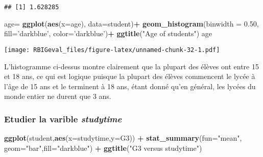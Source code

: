 \documentclass[
]{article}
\newenvironment{Shaded}{\begin{snugshade}}{\end{snugshade}}
\newcommand{\DataTypeTok}[1]{\textcolor[rgb]{0.13,0.29,0.53}{#1}}
\newcommand{\FloatTok}[1]{\textcolor[rgb]{0.00,0.00,0.81}{#1}}
\newcommand{\KeywordTok}[1]{\textcolor[rgb]{0.13,0.29,0.53}{\textbf{#1}}}
\newcommand{\NormalTok}[1]{#1}
\newcommand{\OperatorTok}[1]{\textcolor[rgb]{0.81,0.36,0.00}{\textbf{#1}}}
\newcommand{\StringTok}[1]{\textcolor[rgb]{0.31,0.60,0.02}{#1}}
\begin{document}
\begin{Shaded}
\end{Shaded}

\begin{verbatim}
## [1] 1.628285
\end{verbatim}

\begin{Shaded}
\begin{Highlighting}[]
\NormalTok{age=}\StringTok{ }\KeywordTok{ggplot}\NormalTok{(}\KeywordTok{aes}\NormalTok{(}\DataTypeTok{x=}\NormalTok{age), }\DataTypeTok{data=}\NormalTok{student)}\OperatorTok{+}
\StringTok{  }\KeywordTok{geom_histogram}\NormalTok{(}\DataTypeTok{binwidth =} \FloatTok{0.50}\NormalTok{, }\DataTypeTok{fill=}\StringTok{'darkblue'}\NormalTok{, }\DataTypeTok{color=}\StringTok{'darkblue'}\NormalTok{)}\OperatorTok{+}
\StringTok{  }\KeywordTok{ggtitle}\NormalTok{(}\StringTok{"Age of students"}\NormalTok{)}
\NormalTok{age}
\end{Highlighting}
\end{Shaded}

\texttt{[image: RBIGeval\_files/figure-latex/unnamed-chunk-32-1.pdf]}

L'histogramme ci-dessus montre clairement que la plupart des élèves ont
entre 15 et 18 ans, ce qui est logique puisque la plupart des élèves
commencent le lycée à l'âge de 15 ans et le terminent à 18 ans, étant
donné qu'en général, les lycées du monde entier ne durent que 3 ans.

\hypertarget{etudier-la-varible-studytime}{%
\subsubsection{\texorpdfstring{Etudier la varible
\textbf{\emph{studytime}}}{Etudier la varible studytime}}\label{etudier-la-varible-studytime}}

\begin{Shaded}
\begin{Highlighting}[]
\KeywordTok{ggplot}\NormalTok{(student,}\KeywordTok{aes}\NormalTok{(}\DataTypeTok{x=}\NormalTok{studytime,}\DataTypeTok{y=}\NormalTok{G3)) }\OperatorTok{+}\StringTok{ }\KeywordTok{stat_summary}\NormalTok{(}\DataTypeTok{fun=}\StringTok{"mean"}\NormalTok{, }\DataTypeTok{geom=}\StringTok{"bar"}\NormalTok{,}\DataTypeTok{fill=}\StringTok{"darkblue"}\NormalTok{) }\OperatorTok{+}\StringTok{ }\KeywordTok{ggtitle}\NormalTok{(}\StringTok{"G3 versus studytime"}\NormalTok{)}
\end{Highlighting}
\end{Shaded}
\end{document}
